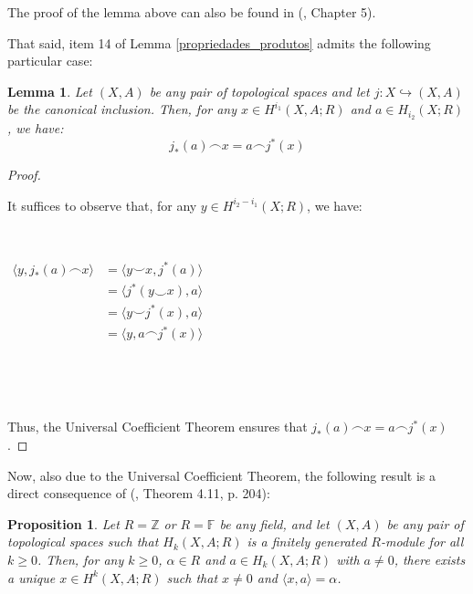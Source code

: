 \documentclass[12pt,oneside]{book}
\newtheorem{prop}   {Proposition}[chapter]
\newtheorem{lem}    {Lemma}[chapter]
\newcommand{\ccup}{\smile}
\newcommand{\ccap}{\frown}
\begin{document}
    The proof of the lemma above can also be found in (\cite{spanier}, Chapter 5).
    
    That said, item 14 of Lemma \ref{propriedades_produtos} admits the following particular case:

    \begin{lem}\label{propriedades_produtos_3}
        Let $(X,A)$ be any pair of topological spaces and let $j:X\hookrightarrow (X,A)$ be the canonical inclusion. Then, for any 
        $x\in H^{i_{1}}(X,A;R)$ and $a\in H_{i_{2}}(X;R)$, we have:
        $$
        j_{*}(a)\ccap x = a\ccap j^{*}(x)
        $$
    \end{lem}
    
    \begin{proof}

        \

        It suffices to observe that, for any $y\in H^{i_{2}-i_{1}}(X;R)$, we have:

        \
        
        $\begin{array}{rl}
            \langle y, j_{*}(a)\ccap x \rangle & = \langle y\ccup x, j^{*}(a) \rangle \\
            & = \langle j^{*}(y\ccup x), a \rangle \\
            & = \langle y\ccup j^{*}(x), a \rangle \\
            & = \langle y, a\ccap j^{*}(x) \rangle
        \end{array}$

        \

        \
    
        Thus, the Universal Coefficient Theorem ensures that $j_{*}(a)\ccap x = a\ccap j^{*}(x)$.
    \end{proof}
    
    Now, also due to the Universal Coefficient Theorem, the 
    following result is a direct consequence of (\cite{hungerford}, Theorem 4.11, p. 204):
    
    \begin{prop}\label{prop_alg_comut}
        Let $R=\mathbb{Z}$ or $R=\mathbb{F}$ be any field, and let $(X,A)$ be any pair of topological 
        spaces such that $H_{k}(X,A;R)$ is a finitely generated 
        $R$-module for all $k\geq 0$. Then, for any $k\geq 0$, 
        $\alpha\in R$ and $a\in H_{k}(X,A;R)$ with $a\neq 0$, there exists a unique $x\in H^{k}(X,A;R)$ 
        such that $x\neq 0$ and $\langle x, a \rangle = \alpha$.
    \end{prop}
    
\end{document}
